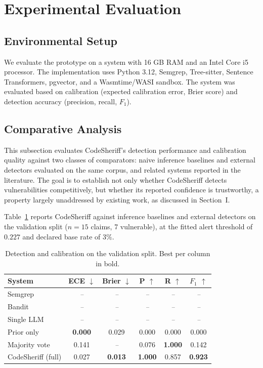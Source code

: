 \documentclass[conference]{IEEEtran}
\newcommand{\missing}[1]{\textit{#1}}
\begin{document}
\section{Experimental Evaluation}
\subsection{Environmental Setup}
We evaluate the prototype on a system with 16 GB RAM and an
Intel Core i5 processor. The implementation uses Python 3.12, Semgrep,
Tree-sitter, Sentence Transformers, pgvector, and a Wasmtime/WASI sandbox.
The system was evaluated based on calibration (expected calibration error,
Brier score) and detection accuracy (precision, recall, $F_1$).

\subsection{Comparative Analysis}
\label{subsec:comparison}

This subsection evaluates CodeSheriff's detection performance and
calibration quality against two classes of comparators: naive inference
baselines and external detectors evaluated on the same corpus, and related
systems reported in the literature. The goal is to establish not only
whether CodeSheriff detects vulnerabilities competitively, but whether its
reported confidence is trustworthy, a property largely unaddressed by
existing work, as discussed in Section~I.

Table~\ref{tab:comparison} reports CodeSheriff against inference baselines
and external detectors on the validation split ($n{=}15$ claims, 7
vulnerable), at the fitted alert threshold of $0.227$ and declared base
rate of $3\%$.

\begin{table}[t]
\centering
\caption{Detection and calibration on the validation split. Best per column
in bold.}
\label{tab:comparison}
\small
\setlength{\tabcolsep}{4pt}
\begin{tabular}{lccccc}
\toprule
System & ECE $\downarrow$ & Brier $\downarrow$ & P $\uparrow$ & R $\uparrow$ & $F_1$ $\uparrow$ \\
\midrule
Semgrep~\cite{semgrep}      & \missing{--} & \missing{--} & \missing{--} & \missing{--} & \missing{--} \\
Bandit~\cite{bandit}        & \missing{--} & \missing{--} & \missing{--} & \missing{--} & \missing{--} \\
Single LLM~\cite{ref17}     & \missing{--} & \missing{--} & \missing{--} & \missing{--} & \missing{--} \\
Prior only                  & \textbf{0.000} & 0.029 & 0.000 & 0.000 & 0.000 \\
Majority vote~\cite{ref16}  & 0.141 & \missing{--} & 0.076 & \textbf{1.000} & 0.142 \\
CodeSheriff (full)          & 0.027 & \textbf{0.013} & \textbf{1.000} & 0.857 & \textbf{0.923} \\
\bottomrule
\end{tabular}
\end{table}
\end{document}
